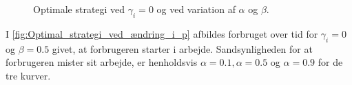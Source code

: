 \begin{figure} [H] 
    \begin{center}
      \resizebox{12cm}{!}{}
    \end{center}
    \caption{Optimale strategi ved $\gamma_i=0$ og ved variation af $\alpha$ og $\beta$.}\label{fig:Optimal_strategi_ved_ændring_i_p}
\end{figure}




% 

% 
I \autoref{fig:Optimal_strategi_ved_ændring_i_p} afbildes forbruget over tid for $\gamma_i=0$ og $\beta=0.5$ givet, at forbrugeren starter i arbejde. Sandsynligheden for at forbrugeren mister sit arbejde, er henholdsvis $\alpha=0.1, \alpha=0.5$ og $\alpha=0.9$ for de tre kurver. 




